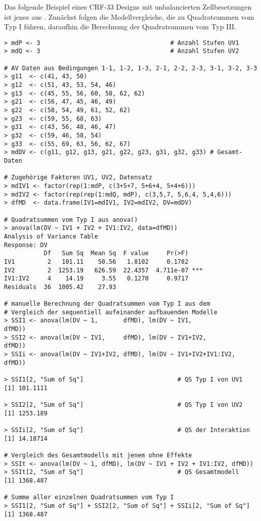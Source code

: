 Das folgende Beispiel eines CRF-$33$ Designs mit unbalancierten Zellbesetzungen ist jenes aus . Zunächst folgen die Modellvergleiche, die zu Quadratsummen vom Typ I führen, daraufhin die Berechnung der Quadratsummen vom Typ III\@.
\begin{lstlisting}
> mdP <- 3                                    # Anzahl Stufen UV1
> mdQ <- 3                                    # Anzahl Stufen UV2

# AV Daten aus Bedingungen 1-1, 1-2, 1-3, 2-1, 2-2, 2-3, 3-1, 3-2, 3-3
> g11  <- c(41, 43, 50)
> g12  <- c(51, 43, 53, 54, 46)
> g13  <- c(45, 55, 56, 60, 58, 62, 62)
> g21  <- c(56, 47, 45, 46, 49)
> g22  <- c(58, 54, 49, 61, 52, 62)
> g23  <- c(59, 55, 68, 63)
> g31  <- c(43, 56, 48, 46, 47)
> g32  <- c(59, 46, 58, 54)
> g33  <- c(55, 69, 63, 56, 62, 67)
> mdDV <- c(g11, g12, g13, g21, g22, g23, g31, g32, g33) # Gesamt-Daten

# Zugehörige Faktoren UV1, UV2, Datensatz
> mdIV1 <- factor(rep(1:mdP, c(3+5+7, 5+6+4, 5+4+6)))
> mdIV2 <- factor(rep(rep(1:mdQ, mdP), c(3,5,7, 5,6,4, 5,4,6)))
> dfMD  <- data.frame(IV1=mdIV1, IV2=mdIV2, DV=mdDV)

# Quadratsummen vom Typ I aus anova()
> anova(lm(DV ~ IV1 + IV2 + IV1:IV2, data=dfMD))
Analysis of Variance Table
Response: DV
           Df   Sum Sq  Mean Sq  F value     Pr(>F)
IV1         2   101.11    50.56   1.8102     0.1782
IV2         2  1253.19   626.59  22.4357  4.711e-07 ***
IV1:IV2     4    14.19     3.55   0.1270     0.9717
Residuals  36  1005.42    27.93

# manuelle Berechnung der Quadratsummen vom Typ I aus dem
# Vergleich der sequentiell aufeinander aufbauenden Modelle
> SSI1 <- anova(lm(DV ~ 1,       dfMD), lm(DV ~ IV1,             dfMD))
> SSI2 <- anova(lm(DV ~ IV1,     dfMD), lm(DV ~ IV1+IV2,         dfMD))
> SSIi <- anova(lm(DV ~ IV1+IV2, dfMD), lm(DV ~ IV1+IV2+IV1:IV2, dfMD))

> SSI1[2, "Sum of Sq"]                          # QS Typ I von UV1
[1] 101.1111

> SSI2[2, "Sum of Sq"]                          # QS Typ I von UV2
[1] 1253.189

> SSIi[2, "Sum of Sq"]                          # QS der Interaktion
[1] 14.18714

# Vergleich des Gesamtmodells mit jenem ohne Effekte
> SSIt <- anova(lm(DV ~ 1, dfMD), lm(DV ~ IV1 + IV2 + IV1:IV2, dfMD))
> SSIt[2, "Sum of Sq"]                          # QS Gesamtmodell
[1] 1368.487

# Summe aller einzelnen Quadratsummen vom Typ I
> SSI1[2, "Sum of Sq"] + SSI2[2, "Sum of Sq"] + SSIi[2, "Sum of Sq"]
[1] 1368.487
\end{lstlisting}

